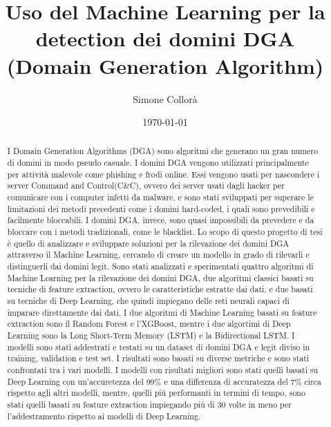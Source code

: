 \documentclass[12pt,a4paper,openright,twoside]{book}
\title{Uso del Machine Learning per la detection dei domini DGA \break (Domain Generation Algorithm)}
\author{Simone Collorà}
\date{\today}
\begin{document}
\frontmatter\frontispiece
\nocite{*}

\begin{abstract}	
I Domain Generation Algorithms (DGA) sono algoritmi che generano un gran numero
di domini in modo pseudo casuale.
I domini DGA vengono utilizzati principalmente per attività malevole come phishing e frodi online.
Essi vengono usati per nascondere i server Command and Control(C\&C), ovvero dei server
usati dagli hacker per comunicare con i computer infetti da malware,
e sono stati sviluppati per superare le limitazioni
dei metodi precedenti come i domini hard-coded, i quali
sono prevedibili e facilmente bloccabili.
I domini DGA, invece, sono quasi impossibili da prevedere e da bloccare con i metodi tradizionali,
come le blacklist.
Lo scopo di questo progetto di tesi è quello di analizzare
e sviluppare soluzioni per la rilevazione dei domini DGA attraverso il Machine Learning, cercando
di creare un modello in grado di rilevarli e distinguerli
dai domini legit.
Sono stati analizzati e sperimentati quattro algoritmi di Machine Learning
per la rilevazione dei domini DGA, due algoritmi classici 
basati su tecniche di feature extraction, ovvero le caratteristiche estratte dai dati,
e due basati su tecniche di Deep Learning, che quindi impiegano delle
reti neurali capaci di imparare direttamente dai dati.
I due algoritmi di Machine Learning basati su feature extraction
sono il Random Forest e l'XGBoost, mentre i due algortimi
di Deep Learning sono la Long Short-Term Memory (LSTM) e la Bidirectional LSTM.
I modelli sono stati addestrati e testati su un dataset di domini
DGA e legit diviso in training, validation e test set.
I risultati sono basati su diverse metriche e
sono stati confrontati tra i vari modelli.
I modelli con risultati migliori sono stati
quelli basati su Deep Learning con un'accuretezza del 99\% e una differenza di accuratezza del 7\%
circa rispetto agli altri modelli,
mentre, quelli più performanti in termini di tempo,
sono stati quelli basati su feature extraction
impiegando più di 30 volte in meno per l'addestramento rispetto ai modelli di Deep Learning.
\end{abstract}



\tableofcontents   
\listoffigures     %
\end{document}
